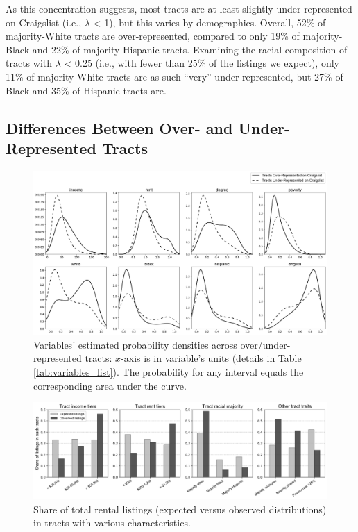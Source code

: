 \documentclass[11pt,letterpaper]{article}
\begin{document}
As this concentration suggests, most tracts are at least slightly under-represented on Craigslist (i.e., $\lambda$ < 1), but this varies by demographics. Overall, 52\% of majority-White tracts are over-represented, compared to only 19\% of majority-Black and 22\% of majority-Hispanic tracts. Examining the racial composition of tracts with $\lambda$ < 0.25 (i.e., with fewer than 25\% of the listings we expect), only 11\% of majority-White tracts are as such \enquote{very} under-represented, but 27\% of Black and 35\% of Hispanic tracts are.

\subsection{Differences Between Over- and Under-Represented Tracts}

\begin{figure}[tbp]
	\centering
	\includegraphics[width=1\textwidth]{fig_variable_distributions.png}
	\caption{Variables' estimated probability densities across over/under- represented tracts: $x$-axis is in variable's units (details in Table \ref{tab:variables_list}). The probability for any interval equals the corresponding area under the curve.}
	\label{fig:variable_distributions}
\end{figure}

\begin{figure}[tbp]
	\centering
	\includegraphics[width=1\textwidth]{fig_tract_shares_grouped.png}
	\caption{Share of total rental listings (expected versus observed distributions) in tracts with various characteristics.}
	\label{fig:tract_shares}
\end{figure}
\end{document}

